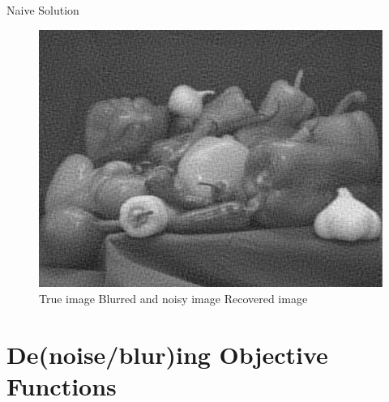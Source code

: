 \documentclass[12pt]{beamer}
\begin{document}
\begin{frame}{Naive Solution}
\begin{figure}
\includegraphics[scale=0.2]{../figures/fig5} \\
\small{\hspace{1em} True image \hspace{2em} Blurred and noisy image \hspace{1em} Recovered image}
\end{figure}
\end{frame}

\section{De(noise/blur)ing Objective Functions}
\end{document}
